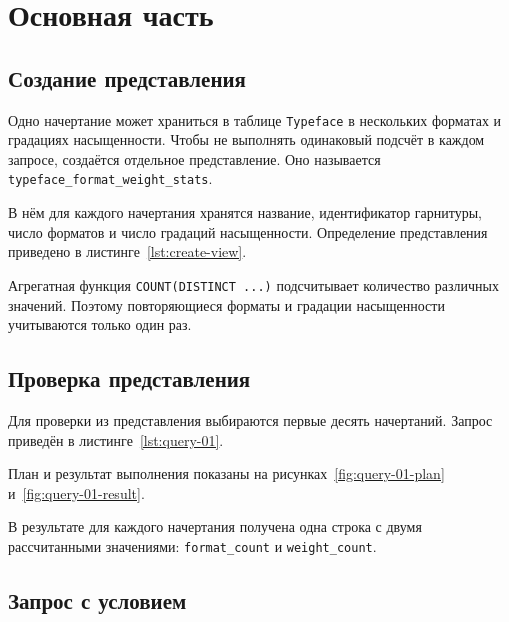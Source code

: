 \section{Основная часть}

\subsection{Создание представления}

Одно начертание может храниться в таблице \texttt{Typeface} в
нескольких форматах и градациях насыщенности. Чтобы не выполнять одинаковый
подсчёт в каждом запросе, создаётся отдельное представление. Оно называется
\texttt{typeface_format_weight_stats}.

В нём для каждого начертания хранятся название, идентификатор гарнитуры, число
форматов и число градаций насыщенности. Определение представления приведено в
листинге~\ref{lst:create-view}.


Агрегатная функция \texttt{COUNT(DISTINCT ...)} подсчитывает
количество различных значений. Поэтому повторяющиеся форматы и градации
насыщенности учитываются только один раз.

\subsection{Проверка представления}

Для проверки из представления выбираются первые десять начертаний. Запрос
приведён в листинге~\ref{lst:query-01}.


План и результат выполнения показаны на
рисунках~\ref{fig:query-01-plan} и~\ref{fig:query-01-result}.



В результате для каждого начертания получена одна строка с двумя рассчитанными
значениями: \texttt{format_count} и
\texttt{weight_count}.

\clearpage
\subsection{Запрос с условием}

